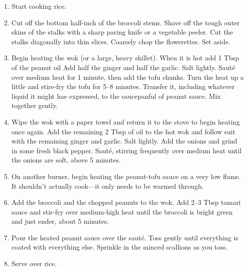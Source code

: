 \begin{recipe}
  \begin{enumerate}

  \item Start cooking rice.

  \item Cut off the bottom half-inch of the broccoli stems.  Shave off
    the tough outer skins of the stalks with a sharp paring knife or a
    vegetable peeler.  Cut the stalks diagonally into thin slices.
    Coarsely chop the flowerettes.  Set aside.

  \item Begin heating the wok (or a large, heavy skillet).  When it is
    hot add 1 Tbsp of the peanut oil  Add half the ginger and half the
    garlic.  Salt lightly.  Saut\'e over medium heat for 1 minute,
    then add the tofu chunks.  Turn the heat up a little and stire-fry
    the tofu for 5--8 minutes.  Transfer it, including whatever liquid
    it might hae expressed, to the saucepanful of peanut sauce.  Mix
    together gently.

  \item Wipe the wok with a paper towel and return it to the stove to
    begin heating once again.  Add the remaining 2 Tbsp of oil to the
    hot wok and follow suit with the remaining ginger and garlic.
    Salt lightly.  Add the onions and grind in some fresh black
    pepper.  Saut\'e, stirring frequently over medium heat until the
    onions are soft, above 5 minutes.

  \item On another burner, begin heating the peanut-tofu sauce on a
    very low flame.  It shouldn't actually cook---it only needs to be
    warmed through.

  \item Add the broccoli and the chopped peanuts to the wok.  Add 2--3
    Tbsp tamari sauce and stir-fry over medium-high heat until the
    broccoli is bright green and just ender, about 5 minutes.

  \item Pour the heated peanut sauce over the saut\'e.  Toss gently
    until everything is coated with everything else.  Sprinkle in the
    minced scallions as you toss.

  \item Serve over rice.

  \end{enumerate}
\end{recipe}
